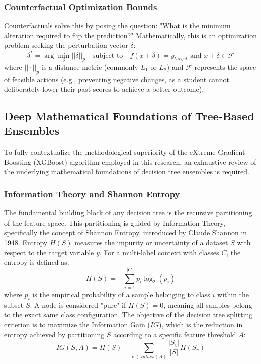 \subsubsection{Counterfactual Optimization Bounds}
Counterfactuals solve this by posing the question: "What is the minimum alteration required to flip the prediction?" Mathematically, this is an optimization problem seeking the perturbation vector $\delta$:
\begin{equation}
    \delta^* = \arg \min_{\delta} || \delta ||_p \quad \text{subject to} \quad f(x + \delta) = y_{target} \text{ and } x+\delta \in \mathcal{F}
\end{equation}
where $|| \cdot ||_p$ is a distance metric (commonly $L_1$ or $L_2$) and $\mathcal{F}$ represents the space of feasible actions (e.g., preventing negative changes, as a student cannot deliberately lower their past scores to achieve a better outcome).





\subsection{Deep Mathematical Foundations of Tree-Based Ensembles}

To fully contextualize the methodological superiority of the eXtreme Gradient Boosting (XGBoost) algorithm employed in this research, an exhaustive review of the underlying mathematical foundations of decision tree ensembles is required. 

\subsubsection{Information Theory and Shannon Entropy}
The fundamental building block of any decision tree is the recursive partitioning of the feature space. This partitioning is guided by Information Theory, specifically the concept of Shannon Entropy, introduced by Claude Shannon in 1948. Entropy $H(S)$ measures the impurity or uncertainty of a dataset $S$ with respect to the target variable $y$. For a multi-label \parencite{tsoumakas2007multi} context with classes $C$, the entropy is defined as:
\begin{equation}
    H(S) = - \sum_{i=1}^{|C|} p_i \log_2 (p_i)
\end{equation}
where $p_i$ is the empirical probability of a sample belonging to class $i$ within the subset $S$. A node is considered "pure" if $H(S) = 0$, meaning all samples belong to the exact same class configuration. The objective of the decision tree splitting criterion is to maximize the Information Gain ($IG$), which is the reduction in entropy achieved by partitioning $S$ according to a specific feature threshold $A$:
\begin{equation}
    IG(S, A) = H(S) - \sum_{v \in Values(A)} \frac{|S_v|}{|S|} H(S_v)
\end{equation}

